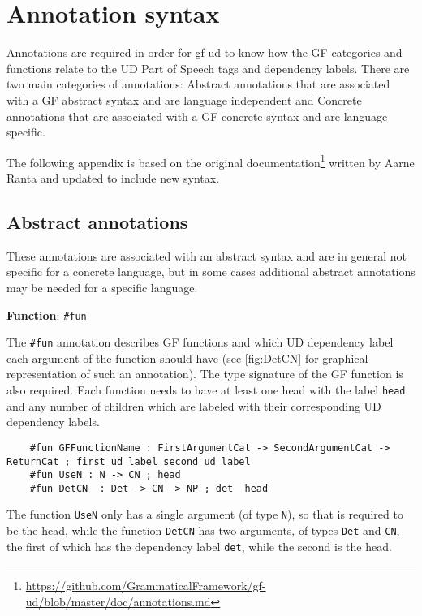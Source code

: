 \chapter{Annotation syntax}\label{app:annotation}

Annotations are required in order for gf-ud to know how the GF categories and functions relate to the UD Part of Speech tags and dependency labels. There are two main categories of annotations: Abstract annotations that are associated with a GF abstract syntax and are language independent and Concrete annotations that are associated with a GF concrete syntax and are language specific.

The following appendix is based on the original documentation\footnote{\url{https://github.com/GrammaticalFramework/gf-ud/blob/master/doc/annotations.md}} written by Aarne Ranta and updated to include new syntax. 

\hypertarget{abstract-annotations}{%
\section{Abstract annotations}\label{abstract-annotations}}

These annotations are associated with an abstract syntax and are in general not specific for a concrete language, but in some cases additional abstract annotations may be needed for a specific language.


\textbf{Function}: \texttt{\#fun}

The \lstinline{#fun} annotation describes GF functions and which UD dependency label each argument of the function should have (see \autoref{fig:DetCN} for graphical representation of such an annotation). The type signature of the GF function is also required. Each function needs to have at least one head with the label \lstinline{head} and any number of children which are labeled with their corresponding UD dependency labels. 

\begin{lstlisting}
    #fun GFFunctionName : FirstArgumentCat -> SecondArgumentCat -> ReturnCat ; first_ud_label second_ud_label
    #fun UseN : N -> CN ; head
    #fun DetCN  : Det -> CN -> NP ; det  head    
\end{lstlisting}

The function \lstinline{UseN} only has a single argument (of type \lstinline{N}), so that is required to be the head, while the function \verb|DetCN| has two arguments, of types \verb|Det| and \verb|CN|, the first of which has the dependency label \verb|det|, while the second is the head.

